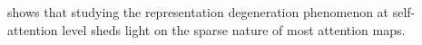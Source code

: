  shows that studying the representation degeneration phenomenon at self-attention level sheds light on the sparse nature of most attention maps. 